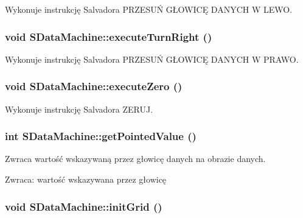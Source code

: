 Wykonuje instrukcję Salvadora PRZESUŃ GŁOWICĘ DANYCH W LEWO. \hypertarget{classSDataMachine_fb6f52c7f14afa51eed848f354d57924}{
\subsubsection[{executeTurnRight}]{\setlength{\rightskip}{0pt plus 5cm}void SDataMachine::executeTurnRight ()}}
\label{classSDataMachine_fb6f52c7f14afa51eed848f354d57924}


Wykonuje instrukcję Salvadora PRZESUŃ GŁOWICĘ DANYCH W PRAWO. \hypertarget{classSDataMachine_27c3e6dfe9ac45f9d5eed7c97f96abd8}{
\subsubsection[{executeZero}]{\setlength{\rightskip}{0pt plus 5cm}void SDataMachine::executeZero ()}}
\label{classSDataMachine_27c3e6dfe9ac45f9d5eed7c97f96abd8}


Wykonuje instrukcję Salvadora ZERUJ. \hypertarget{classSDataMachine_3a191be9cab718274d6bd75e01cc2a26}{
\subsubsection[{getPointedValue}]{\setlength{\rightskip}{0pt plus 5cm}int SDataMachine::getPointedValue ()}}
\label{classSDataMachine_3a191be9cab718274d6bd75e01cc2a26}


Zwraca wartość wskazywaną przez głowicę danych na obrazie danych. \begin{Desc}
\item[Zwraca:]wartość wskazywana przez głowicę \end{Desc}
\hypertarget{classSDataMachine_7957d23c5b2fdae9249fb6e1e0c55982}{
\subsubsection[{initGrid}]{\setlength{\rightskip}{0pt plus 5cm}void SDataMachine::initGrid ()}}
\label{classSDataMachine_7957d23c5b2fdae9249fb6e1e0c55982}


